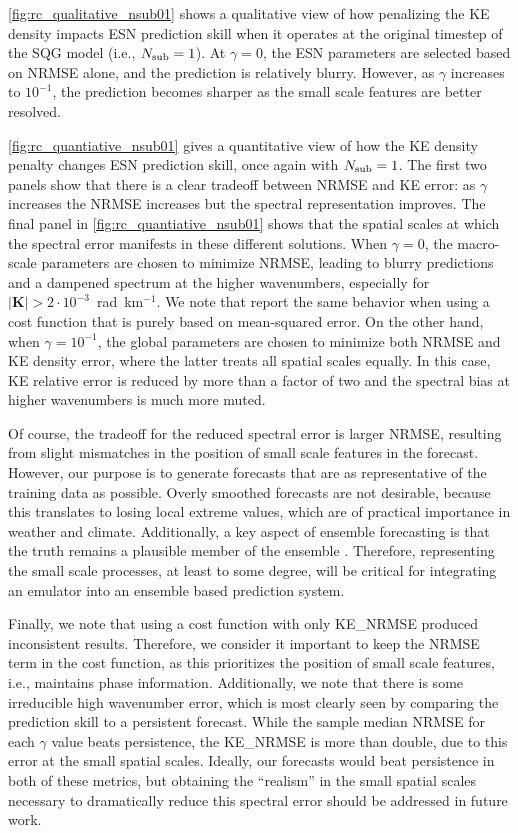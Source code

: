 \documentclass[draft]{agujournal2019}
\newcommand{\citep}{\cite}
\newcommand{\citet}{\citeA}
\begin{document}
\cref{fig:rc_qualitative_nsub01} shows a qualitative view of how penalizing the
KE density impacts ESN prediction skill when it operates at the original
timestep of the SQG model (i.e., $N_\text{sub}=1$).
At $\gamma=0$, the ESN parameters are selected based on NRMSE alone, and
the prediction is relatively blurry.
However, as $\gamma$ increases to $10^{-1}$, the prediction becomes sharper as
the small scale features are better resolved.

\cref{fig:rc_quantiative_nsub01} gives a quantitative view of how the KE density
penalty changes ESN prediction skill, once again with $N_\text{sub}=1$.
The first two panels show that there is a clear tradeoff between NRMSE and KE error:
as $\gamma$ increases the NRMSE increases but the spectral representation improves.
The final panel in \cref{fig:rc_quantiative_nsub01}
shows that the spatial scales at which the spectral error manifests in these
different solutions.
When $\gamma=0$, the macro-scale parameters are chosen to minimize NRMSE,
leading to blurry predictions and a dampened spectrum at the higher wavenumbers,
especially for $|\mathbf{K}| > 2\cdot10^{-3}$~rad~km$^{-1}$.
We note that \citet{lam_graphcast_2022} report the same behavior when using a cost function that is purely based on mean-squared error.
On the other hand, when $\gamma = 10^{-1}$, the global parameters are chosen to
minimize both NRMSE and KE density error, where the latter treats all spatial
scales equally.
In this case, KE relative error is reduced by more than a factor of two and the
spectral bias at higher wavenumbers is much more muted.


Of course, the tradeoff for the reduced spectral error is larger NRMSE, resulting
from slight mismatches in the position of small scale features in the forecast.
However, our purpose is to generate forecasts that are as representative
of the training data as possible.
Overly smoothed forecasts are not desirable, because this translates to losing local extreme values,
which are of practical importance in weather and climate.
Additionally, a key aspect of ensemble forecasting is that the truth remains a
plausible member of the ensemble \citep{kalnay_ensemble_2006}.
Therefore, representing the small scale processes, at least to some degree,
will be critical for integrating an
emulator into an ensemble based prediction system.

Finally, we note that using a cost function with only KE\_NRMSE produced inconsistent
results.
Therefore, we consider it important to keep the NRMSE term in the
cost function, as this prioritizes the position of small scale features, i.e.,
maintains phase information.
Additionally, we note that there is some irreducible high wavenumber error,
which is most clearly seen by comparing the prediction skill to a persistent
forecast.
While the sample median NRMSE for each $\gamma$ value beats persistence, the
KE\_NRMSE is more than double, due to this error at the small spatial scales.
Ideally, our forecasts would beat persistence in both of these metrics, but
obtaining the ``realism'' in the small spatial scales necessary to
dramatically reduce this spectral error should be addressed in future work.
\end{document}
